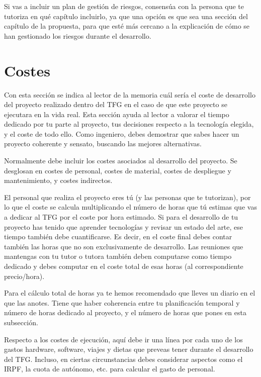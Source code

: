 Si vas a incluir un plan de gestión de riesgos, consensúa con la persona que te tutoriza en qué capítulo incluirlo, ya que una opción es que sea una sección del capítulo de la propuesta, para que esté más cercano a la explicación de  cómo se han gestionado los riesgos durante el desarrollo.

\section{Costes}

Con esta sección se indica al lector de la memoria cuál sería el coste de desarrollo del proyecto realizado dentro del TFG en el caso de que este proyecto se ejecutara en la vida real. Esta sección ayuda al lector a valorar el tiempo dedicado por tu parte al proyecto, tus decisiones respecto a la tecnología elegida, y el coste de todo ello. Como ingeniero, debes demostrar que sabes hacer un proyecto coherente  y sensato, buscando las mejores alternativas. 

Normalmente debe incluir los costes asociados al desarrollo del proyecto. Se desglosan en costes de personal, costes de material, costes de despliegue y mantenimiento, y costes indirectos.

El personal que realiza el proyecto eres tú (y las personas que te tutorizan), por lo que el coste se calcula multiplicando el número de horas que tú estimas que vas a dedicar al TFG por el coste por hora estimado. Si para el desarrollo de tu proyecto has tenido que aprender tecnologías y revisar un estado del arte, ese tiempo también debe cuantificarse. Es decir, en el coste final debes contar también las horas que no son exclusivamente de desarrollo. Las reuniones que mantengas con tu tutor o tutora también deben computarse como tiempo dedicado y debes computar en el coste total de esas horas (al correspondiente precio/hora).

Para el cálculo total de horas ya te hemos recomendado que lleves un diario en el que las anotes. Tiene que haber coherencia entre tu planificación temporal y número de horas dedicado al proyecto, y el número de horas que pones en esta subsección.

Respecto a los costes de ejecución, aquí debe ir una línea por cada uno de los gastos hardware, software, viajes y dietas que preveas tener durante el desarrollo del TFG. Incluso, en ciertas circunstancias debes considerar aspectos como el IRPF, la cuota de autónomo, etc. para calcular el gasto de personal.

